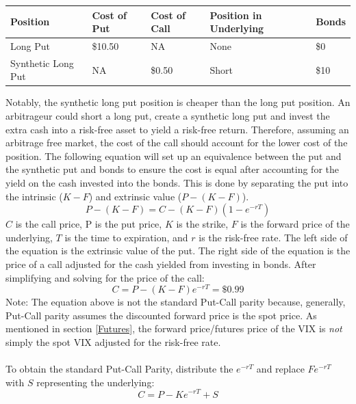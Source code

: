\documentclass[11pt, oneside]{book}
\begin{document}
\begin{center}
\begin{tabular}{|m{4cm}|m{1.5cm}|m{1.5cm}|m{2cm}|m{1.1cm}|}
    \hline
    \textbf{Position} & \textbf{Cost of Put} & \textbf{Cost of Call} & \textbf{Position in Underlying} & \textbf{Bonds} \\ 
    \hline
    Long Put & \$10.50 & NA & None & \$0\\ 
    \hline
    Synthetic Long Put & NA & \$0.50 & Short & \$10\\ 
    \hline
\end{tabular}
\end{center}
Notably, the synthetic long put position is cheaper than the long put position. An arbitrageur could short a long put, create a synthetic long put and invest the extra cash into a risk-free asset to yield a risk-free return. Therefore, assuming an arbitrage free market, the cost of the call should account for the lower cost of the position. The following equation will set up an equivalence between the put and the synthetic put and bonds to ensure the cost is equal after accounting for the yield on the cash invested into the bonds. This is done by separating the put into the intrinsic ($K - F$) and extrinsic value ($P - (K - F)$).
\begin{equation}
P - (K - F) = C - (K - F)(1 - e^{-rT})
\end{equation} \label{Eq-PutCallParity}
$C$ is the call price, P is the put price, $K$ is the strike, $F$ is the forward price of the underlying, $T$ is the time to expiration, and $r$ is the risk-free rate. The left side of the equation is the extrinsic value of the put. The right side of the equation is the price of a call adjusted for the cash yielded from investing in bonds. After simplifying and solving for the price of the call:
\begin{equation}
C = P - (K - F)e^{-rT} = \$0.99
\end{equation} \label{Eq-PutCallParityEval}
Note: The equation above is not the standard Put-Call parity because, generally, Put-Call parity assumes the discounted forward price is the spot price. As mentioned in section \ref{Futures}, the forward price/futures price of the VIX is \textit{not} simply the spot VIX adjusted for the risk-free rate. \\
\\
To obtain the standard Put-Call Parity, distribute the $e^{-rT}$ and replace $Fe^{-rT}$ with $S$ representing the underlying:
\begin{equation}
C = P - Ke^{-rT} + S
\end{equation} \label{Eq-StandardPutCallParity}
\end{document}
